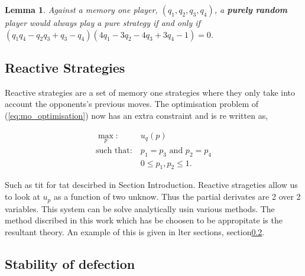 \documentclass[10pt]{article}
\newtheorem{lemma}[theorem]{Lemma}
\begin{document}
\begin{lemma}\label{lemma:linear}
    Against a memory one player, \((q_1, q_2, q_3, q_4)\), a \textbf{purely random}
    player would always play a pure strategy if and only if
    \((q_{1}q_{4} - q_{2} q_{3} + q_{3} - q_{4}) (4 q_{1} - 3 q_{2} - 4 q_{3} + 3 
    q_{4} - 1) = 0\).
\end{lemma}

\subsection{Reactive Strategies}


Reactive strategies are a set of memory one strategies where they only take into
account the opponents's previous moves. The optimisation problem of (\ref{eq:mo_optimisation})
now has an extra constraint and is re written as,

\begin{equation}\label{eq:random_optimisation}
\begin{aligned}
\max_p: & \ u_q(p)
\\
\text{such that}: & \ p_1 = p_3 \text{ and } p_2 = p_4\\
    & \ 0 \leq p_1, p_2 \leq 1.
\end{aligned}
\end{equation}

Such as tit for tat descirbed in Section Introduction. Reactive strageties
allow us to look at \(u_p\) as a function of two unknow. Thus the partial
derivates are 2 over 2 variables. This system can be solve analytically usin various
methods. The method discribed in this work which has be choosen to be appropitate
is the resultant theory. An example of this is given in lter sections, section\ref{}.

\subsection{Stability of defection}


\end{document}
